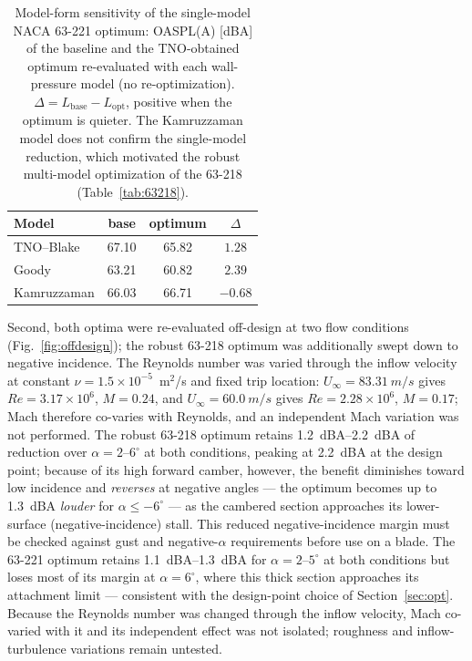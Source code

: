 \documentclass[preprint,3p,times]{elsarticle}
\begin{document}
\begin{table}[!htbp]\centering
\caption{Model-form sensitivity of the single-model NACA 63-221 optimum:
OASPL(A) [dBA] of the baseline and the TNO-obtained optimum re-evaluated with
each wall-pressure model (no re-optimization). $\Delta =
L_{\mathrm{base}}-L_{\mathrm{opt}}$, positive when the optimum is quieter. The
Kamruzzaman model does not confirm the single-model reduction, which motivated
the robust multi-model optimization of the 63-218 (Table~\ref{tab:63218}).}
\label{tab:wps}
\begin{tabular}{@{}lccc@{}}
\toprule
Model & base & optimum & $\Delta$ \\
\midrule
TNO--Blake  & 67.10 & 65.82 & $1.28$ \\
Goody       & 63.21 & 60.82 & $2.39$ \\
Kamruzzaman & 66.03 & 66.71 & $-0.68$ \\
\bottomrule
\end{tabular}
\end{table}

Second, both optima were re-evaluated off-design at two flow conditions
(Fig.~\ref{fig:offdesign}); the robust 63-218 optimum was additionally swept
down to negative incidence. The Reynolds number was
varied through the inflow velocity at constant $\nu=1.5\times10^{-5}$~m$^2$/s
and fixed trip location: $U_\infty=\SI{83.31}{m/s}$ gives
$Re=3.17\times10^6$, $M=0.24$, and $U_\infty=\SI{60.0}{m/s}$ gives
$Re=2.28\times10^6$, $M=0.17$; Mach therefore co-varies with Reynolds, and an
independent Mach variation was not performed. The robust 63-218 optimum retains
\SIrange{1.2}{2.2}{dBA} of reduction over $\alpha=2$--$6^{\circ}$ at both
conditions, peaking at \SI{2.2}{dBA} at the design point; because of its high
forward camber, however, the benefit diminishes toward low incidence and
\emph{reverses} at negative angles --- the optimum becomes up to \SI{1.3}{dBA}
\emph{louder} for $\alpha\le-6^{\circ}$ --- as the cambered section approaches
its lower-surface (negative-incidence) stall. This reduced negative-incidence
margin must be checked against gust and negative-$\alpha$ requirements before
use on a blade. The 63-221 optimum retains
\SIrange{1.1}{1.3}{dBA} for $\alpha=2$--$5^{\circ}$ at both conditions
but loses most of its margin at $\alpha=6^{\circ}$, where this thick section
approaches its attachment limit --- consistent with the design-point choice
of Section~\ref{sec:opt}. Because the Reynolds number was changed through the
inflow velocity, Mach co-varied with it and its independent effect was not
isolated; roughness and inflow-turbulence
variations remain untested.
\end{document}
